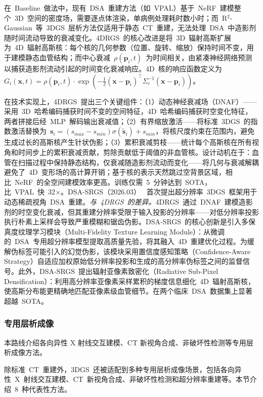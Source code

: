 在~Baseline~做法中，现有~DSA~重建方法（如~VPAL）基于~NeRF~建模整个~3D~空间的密度场，需要逐点体渲染，单病例处理耗时数小时；而~R$^2$-Gaussian~等~3DGS~层析方法仅适用于静态~CT~重建，无法处理~DSA~中造影剂随时间流动导致的衰减变化。4DRGS~的核心改进是将~3D~辐射高斯扩展为~4D~辐射高斯核：每个核的几何参数（位置、旋转、缩放）保持时间不变，用于建模静态血管结构；而中心衰减~$\rho(\bm{p}_i, t)$~为时间相关，由紧凑神经网络预测以捕获造影剂流动引起的时间变化衰减响应。4D~核的响应函数定义为~$G_i(\bm{x}, t) = \rho(\bm{p}_i, t) \cdot \exp(-\frac{1}{2}(\bm{x} - \bm{p}_i)^\top \Sigma_i^{-1}(\bm{x} - \bm{p}_i))$。

在技术实现上，4DRGS~提出三个关键组件：（1）动态神经衰减场（DNAF）——采用~3D~哈希编码捕获时间不变的空间特征，4D~哈希编码捕获时空变化特征，两者拼接后经~MLP~解码输出衰减值；（2）有界缩放激活——将标准~3DGS~的指数激活替换为~$\bm{s}_i = (s_{max} - s_{min})\sigma(\tilde{\bm{s}}_i) + s_{min}$，将核尺度约束在范围内，避免生成过长的高斯核产生针状伪影；（3）累积衰减剪枝——统计每个高斯核在所有视角和时间步上的累积衰减贡献，剪除贡献低于阈值的非血管核。设计动机在于：血管在扫描过程中保持静态结构，仅衰减随造影剂流动而变化——将几何与衰减解耦避免了~4D~变形场的高计算开销；基于核的表示天然跳过空背景区域，相比~NeRF~的全空间建模效率更高。训练仅需~5~分钟达到~SOTA，比~VPAL~快~32$\times$。DSA-SRGS（2026.03）~\cite{2603_04770} 首次提出超分辨率~3DGS~框架用于动态稀疏视角~DSA~重建。\textit{与~4DRGS~的差异。}4DRGS~通过~DNAF~建模造影剂的时空变化衰减，但其重建分辨率受限于输入投影的分辨率——对低分辨率投影执行朴素上采样会导致严重模糊和锯齿伪影。DSA-SRGS~的核心创新是引入多保真度纹理学习模块（Multi-Fidelity Texture Learning Module）：从微调的~DSA~专用超分辨率模型提取高质量先验，将其融入~4D~重建优化过程。为缓解伪标签可能引入的幻觉伪影，该模块采用置信度感知策略（Confidence-Aware Strategy）自适应加权原始低分辨率投影和生成的高分辨率伪标签之间的监督信号。此外，DSA-SRGS~提出辐射亚像素致密化（Radiative Sub-Pixel Densification）：利用高分辨率亚像素采样累积的梯度信息细化~4D~辐射高斯核，使高斯分布能更精确地匹配亚像素级血管细节。在两个临床~DSA~数据集上显著超越~SOTA。

\subsubsection{专用层析成像}

本路线介绍各向异性 X 射线交互建模、CT 新视角合成、非破坏性检测等专用层析成像方法。

除标准~CT~重建外，3DGS~还被适配到多种专用层析成像场景，包括各向异性~X~射线交互建模、CT~新视角合成、非破坏性检测和超分辨率重建等。本节介绍~8~种代表性方法。

